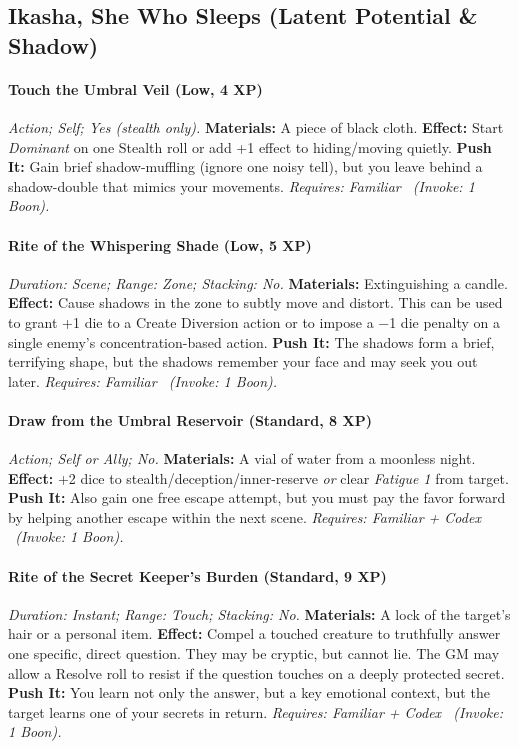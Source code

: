 \subsection{Ikasha, She Who Sleeps (Latent Potential \& Shadow)}
\paragraph{Touch the Umbral Veil (Low, 4 XP)} \emph{Action; Self; Yes (stealth only).}
\textbf{Materials:} A piece of black cloth.
\textbf{Effect:} Start \emph{Dominant} on one Stealth roll or add +1 effect to hiding/moving quietly.
\textbf{Push It:} Gain brief shadow-muffling (ignore one noisy tell), but you leave behind a shadow-double that mimics your movements.
\emph{Requires: Familiar \ (\textit{Invoke:} 1 Boon).}
\paragraph{Rite of the Whispering Shade (Low, 5 XP)} \emph{Duration: Scene; Range: Zone; Stacking: No.}
\textbf{Materials:} Extinguishing a candle.
\textbf{Effect:} Cause shadows in the zone to subtly move and distort. This can be used to grant +1 die to a Create Diversion action or to impose a −1 die penalty on a single enemy's concentration-based action.
\textbf{Push It:} The shadows form a brief, terrifying shape, but the shadows remember your face and may seek you out later.
\emph{Requires: Familiar \ (\textit{Invoke:} 1 Boon).}
\paragraph{Draw from the Umbral Reservoir (Standard, 8 XP)} \emph{Action; Self or Ally; No.}
\textbf{Materials:} A vial of water from a moonless night.
\textbf{Effect:} +2 dice to stealth/deception/inner-reserve \emph{or} clear \emph{Fatigue 1} from target.
\textbf{Push It:} Also gain one free escape attempt, but you must pay the favor forward by helping another escape within the next scene.
\emph{Requires: Familiar + Codex \ (\textit{Invoke:} 1 Boon).}
\paragraph{Rite of the Secret Keeper's Burden (Standard, 9 XP)} \emph{Duration: Instant; Range: Touch; Stacking: No.}
\textbf{Materials:} A lock of the target's hair or a personal item.
\textbf{Effect:} Compel a touched creature to truthfully answer one specific, direct question. They may be cryptic, but cannot lie. The GM may allow a Resolve roll to resist if the question touches on a deeply protected secret.
\textbf{Push It:} You learn not only the answer, but a key emotional context, but the target learns one of your secrets in return.
\emph{Requires: Familiar + Codex \ (\textit{Invoke:} 1 Boon).}
